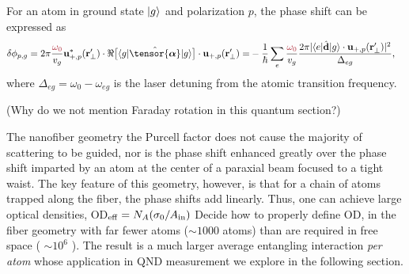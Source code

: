 \documentclass[preprint,aps,pra,onecolumn]{revtex4-1} %
\newcommand{\Ain}{A_{\rm in}}
\newcommand{\comment}[1]{{\color{Maroon} #1}}
\newcommand{\error}[1]{{\color{red} #1}}
\begin{document}
For an atom in ground state $\lvert{g}\rangle$ and polarization $p$, the phase shift can be expressed as \cite{le_kien_propagation_2014}
	\begin{align} \label{Eq::PhaseShiftMultilevel}
		\delta  \phi_{p,g} =2\pi \frac{\comment{ \omega_{0}}}{v_g} \mathbf{u}^*_{+, p}(\br'_\perp) \cdot \Re\big[\bra{g} 
\hat{\tensor{\boldsymbol{\alpha}}} \ket{g} \big] \cdot \mathbf{u}_{+, p}(\br'_\perp) =& -\frac{1}{\hbar} \sum_e \frac{ \comment{ \omega_{0} } }{v_g} \frac{2 \pi |\bra{e}\hat{\mathbf{d}}\ket{g} \cdot \mathbf{u}_{+,p}(\br'_\perp)|^2}{ \Delta_{eg} } ,
	\end{align}
where $\Delta_{eg} = \omega_0 - \omega_{eg}$ is the laser detuning from the atomic transition frequency.  

\comment{(Why do we not mention Faraday rotation in this quantum section?)}

The nanofiber geometry the Purcell factor does not cause the majority of scattering to be guided, nor is the phase shift enhanced greatly over the phase shift imparted by an atom at the center of a paraxial beam focused to a tight waist. The key feature of this geometry, however, is that for a chain of atoms trapped along the fiber, the phase shifts add linearly.  Thus, one can achieve large optical densities, OD$_{\rm eff} = N_A (\sigma_0/\Ain)$ \comment{Decide how to properly define OD}, in the fiber geometry with far fewer atoms ($\sim 1000$ atoms) than are required in free space (\error{ $\sim 10^6$ }).  The result is a much larger average entangling interaction \emph{per atom} whose application in QND measurement we explore in the following section.



\end{document}
